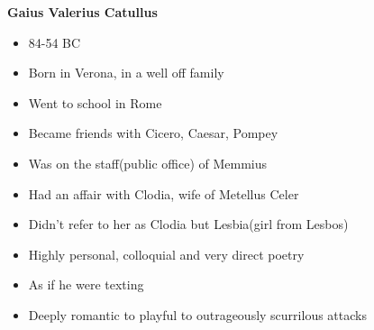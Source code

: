 \documentclass[12pt,a4paper]{report}
\begin{document}
\textbf{Gaius Valerius Catullus}
\begin{itemize}
\item 84-54 BC
\item Born in Verona, in a well off family
\item Went to school in Rome
\item Became friends with Cicero, Caesar, Pompey
\item Was on the staff(public office) of Memmius
\item Had an affair with Clodia, wife of Metellus Celer
\item Didn't refer to her as Clodia but Lesbia(girl from Lesbos)
\item Highly personal, colloquial and very direct poetry
\item As if he were texting
\item Deeply romantic to playful to outrageously scurrilous attacks
\end{itemize}
\end{document}
